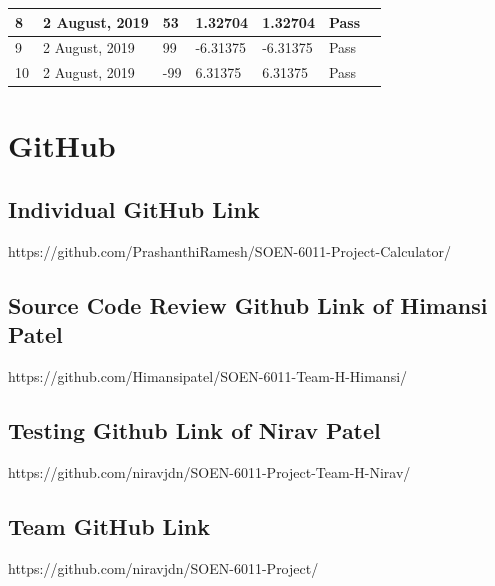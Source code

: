 \documentclass[11pt, english]{report}
\begin{document}
\begin{table}[!htp]
\begin{tabular} {@{}|l|l|l|l|l|l|l|@{}}
8           & 2 August, 2019                            &     53                 & 1.32704 & 1.32704 & Pass                                                 \\ \midrule

9          & 2 August, 2019                             &     99                 &-6.31375 & -6.31375 & Pass                                                 \\ \midrule


10          & 2 August, 2019                             &  -99                    & 6.31375 & 6.31375 & Pass                                                 


\\ \bottomrule
\end{tabular}
\end{table}


\appendix
\chapter{GitHub}
\section{Individual GitHub Link}
https://github.com/PrashanthiRamesh/SOEN-6011-Project-Calculator/

\section{Source Code Review Github Link of Himansi Patel}
https://github.com/Himansipatel/SOEN-6011-Team-H-Himansi/

\section{Testing Github Link of Nirav Patel}
https://github.com/niravjdn/SOEN-6011-Project-Team-H-Nirav/

\section{Team GitHub Link}
https://github.com/niravjdn/SOEN-6011-Project/


\printbibliography

\printglossary
\end{document}
